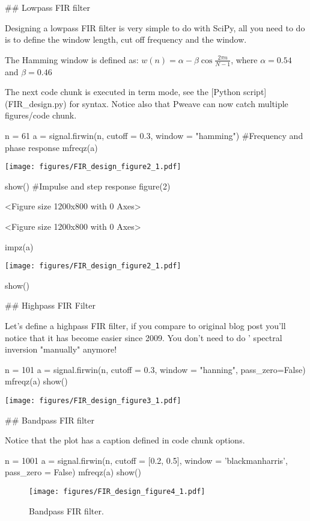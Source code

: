 ## Lowpass FIR filter

Designing a lowpass FIR filter is very simple to do with SciPy, all you
need to do is to define the window length, cut off frequency and the
window.

The Hamming window is defined as:
$w(n) = \alpha - \beta\cos\frac{2\pi n}{N-1}$, where $\alpha=0.54$ and $\beta=0.46$ 

The next code chunk is executed in term mode, see the [Python script](FIR_design.py) for syntax.
Notice also that Pweave can now catch multiple figures/code chunk.


\begin{pweavecode}
n = 61
a = signal.firwin(n, cutoff = 0.3, window = "hamming")
#Frequency and phase response
mfreqz(a)
\end{pweavecode}
\texttt{[image: figures/FIR\_design\_figure2\_1.pdf]}

\begin{pweavecode}
show()
#Impulse and step response
figure(2)
\end{pweavecode}
\begin{pweaveout}
<Figure size 1200x800 with 0 Axes>
\end{pweaveout}
\begin{pweaveout}
<Figure size 1200x800 with 0 Axes>
\end{pweaveout}

\begin{pweavecode}
impz(a)
\end{pweavecode}
\texttt{[image: figures/FIR\_design\_figure2\_1.pdf]}

\begin{pweavecode}
show()
\end{pweavecode}


## Highpass FIR Filter

Let's define a highpass FIR filter, if you compare to original blog
post you'll notice that it has become easier since 2009. You don't
need to do ' spectral inversion "manually" anymore!


\begin{pweavecode}
n = 101
a = signal.firwin(n, cutoff = 0.3, window = "hanning", pass_zero=False)
mfreqz(a)
show()
\end{pweavecode}
\texttt{[image: figures/FIR\_design\_figure3\_1.pdf]}


## Bandpass FIR filter

Notice that the plot has a caption defined in code chunk options.


\begin{pweavecode}
n = 1001
a = signal.firwin(n, cutoff = [0.2, 0.5], window = 'blackmanharris', pass_zero = False)
mfreqz(a)
show()
\end{pweavecode}
\begin{figure}[htpb]
\center
\texttt{[image: figures/FIR\_design\_figure4\_1.pdf]}
\caption{Bandpass FIR filter.}
\label{fig:None}
\end{figure}
